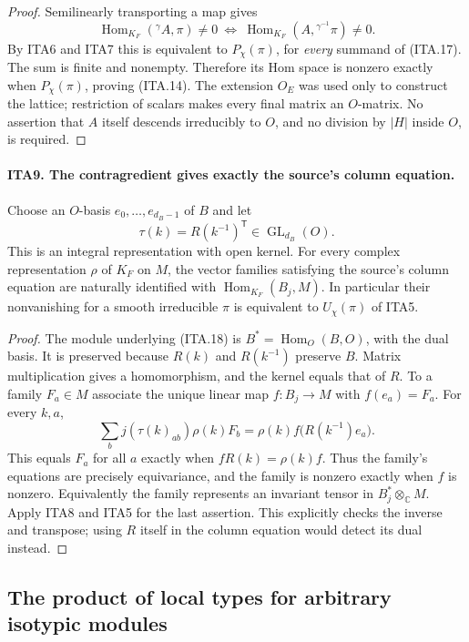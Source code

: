 \documentclass[11pt,a4paper]{article}
\numberwithin{equation}{section}
\theoremstyle{remark}\newtheorem{remark}[theorem]{Remark}
\begin{document}
\begin{proof}
Semilinearly transporting a map gives
\[
 \operatorname{Hom}_{K_F}({}^{\gamma}A,\pi)\ne0
 \ \Longleftrightarrow\
 \operatorname{Hom}_{K_F}(A,{}^{\gamma^{-1}}\pi)\ne0.
\]
By ITA6 and ITA7 this is equivalent to $P_\chi(\pi)$,
for \emph{every} summand of (ITA.17).  The sum is finite
and nonempty.  Therefore its Hom space is nonzero exactly
when $P_\chi(\pi)$, proving (ITA.14).
The extension $O_E$ was used only to construct the lattice;
restriction of scalars makes every final matrix an
$O$-matrix.  No assertion that $A$ itself descends
irreducibly to $O$, and no division by $|H|$ inside $O$,
is required.
\end{proof}

\paragraph{ITA9. The contragredient gives exactly the source's column equation.}
\label{claim:ITA9}
Choose an $O$-basis $e_0,\ldots,e_{d_B-1}$ of $B$ and let
\[
                \tau(k)=R(k^{-1})^{\mathsf T}
                       \in\operatorname{GL}_{d_B}(O).          \tag{ITA.18}
\]
This is an integral representation with open kernel.  For
every complex representation $\rho$ of $K_F$ on $M$,
the vector families satisfying the source's column equation
are naturally identified with
$\operatorname{Hom}_{K_F}(B_j,M)$.  In particular their
nonvanishing for a smooth irreducible $\pi$ is equivalent
to $U_\chi(\pi)$ of ITA5.
\begin{proof}
The module underlying (ITA.18) is $B^*=\operatorname{Hom}_O(B,O)$,
with the dual basis.  It is preserved because $R(k)$ and
$R(k^{-1})$ preserve $B$.  Matrix multiplication gives a
homomorphism, and the kernel equals that of $R$.
To a family $F_a\in M$ associate the unique linear map
$f:B_j\to M$ with $f(e_a)=F_a$.  For every $k,a$,
\[
 \sum_b j(\tau(k)_{ab})\rho(k)F_b
       =\rho(k)f\bigl(R(k^{-1})e_a\bigr).                   \tag{ITA.19}
\]
This equals $F_a$ for all $a$ exactly when
$fR(k)=\rho(k)f$.  Thus the family's equations are
precisely equivariance, and the family is nonzero exactly
when $f$ is nonzero.  Equivalently the family represents
an invariant tensor in $B_j^*\otimes_{\mathbb C}M$.
Apply ITA8 and ITA5 for the last assertion.  This explicitly
checks the inverse and transpose; using $R$ itself in
the column equation would detect its dual instead.
\end{proof}

\subsection{The product of local types for arbitrary isotypic modules}
\end{document}
